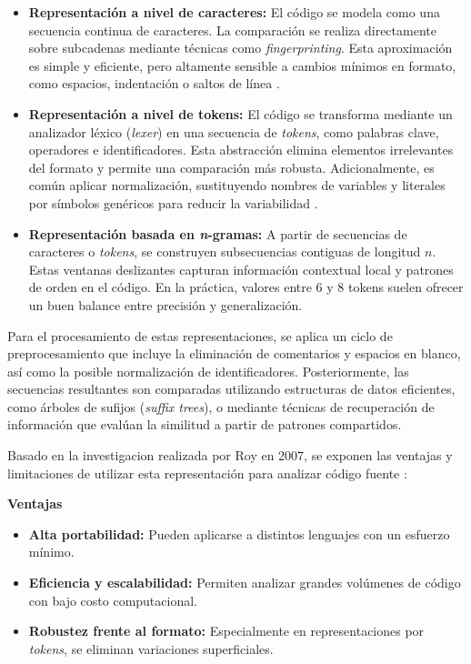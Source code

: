 \begin{itemize}
    \item \textbf{Representación a nivel de caracteres:} El código se modela como una secuencia continua de caracteres. La comparación se realiza directamente sobre subcadenas mediante técnicas como \textit{fingerprinting}. Esta aproximación es simple y eficiente, pero altamente sensible a cambios mínimos en formato, como espacios, indentación o saltos de línea \cite{Roy2007Survey}.
    
    \item \textbf{Representación a nivel de tokens:} El código se transforma mediante un analizador léxico (\textit{lexer}) en una secuencia de \textit{tokens}, como palabras clave, operadores e identificadores. Esta abstracción elimina elementos irrelevantes del formato y permite una comparación más robusta. Adicionalmente, es común aplicar normalización, sustituyendo nombres de variables y literales por símbolos genéricos para reducir la variabilidad \cite{Roy2007Survey}.
    
    \item \textbf{Representación basada en \textit{n}-gramas:} A partir de secuencias de caracteres o \textit{tokens}, se construyen subsecuencias contiguas de longitud $n$. Estas ventanas deslizantes capturan información contextual local y patrones de orden en el código. En la práctica, valores entre 6 y 8 tokens suelen ofrecer un buen balance entre precisión y generalización\cite{Burrows2007Ngrams}.
\end{itemize}

Para el procesamiento de estas representaciones, se aplica un ciclo de preprocesamiento que incluye la eliminación de comentarios y espacios en blanco, así como la posible normalización de identificadores. Posteriormente, las secuencias resultantes son comparadas utilizando estructuras de datos eficientes, como árboles de sufijos (\textit{suffix trees}), o mediante técnicas de recuperación de información que evalúan la similitud a partir de patrones compartidos\cite{Roy2007Survey}.

Basado en la investigacion realizada por Roy en 2007, se exponen las ventajas y limitaciones de utilizar esta representación para analizar código fuente \cite{Roy2007Survey}: 

\textbf{Ventajas}
\begin{itemize}
    \item \textbf{Alta portabilidad:} Pueden aplicarse a distintos lenguajes con un esfuerzo mínimo.
    
    \item \textbf{Eficiencia y escalabilidad:} Permiten analizar grandes volúmenes de código con bajo costo computacional.
    
    \item \textbf{Robustez frente al formato:} Especialmente en representaciones por \textit{tokens}, se eliminan variaciones superficiales.
\end{itemize}

